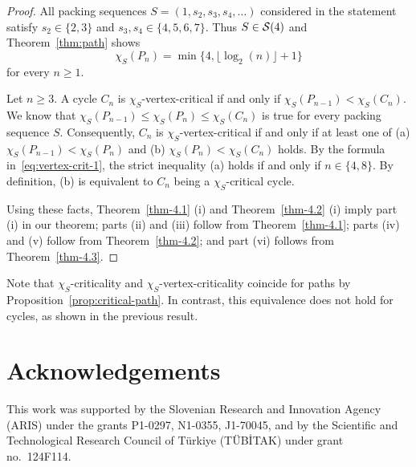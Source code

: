 \documentclass[12pt]{article}
\newcommand{\cS}{{\cal S}}
\begin{document}
    \begin{proof}
        All packing sequences $S=(1, s_2, s_3, s_4, \dots )$ considered in the statement satisfy $s_2 \in \{2,3\}$ and $s_3,s_4 \in \{4,5,6,7\}$.
         Thus  $S \in \cS(4)$ and Theorem~\ref{thm:path} shows
        \begin{equation} \label{eq:vertex-crit-1}
            \chi_S(P_n)= \min \{4,\lfloor \log_2(n) \rfloor +1\}
     \end{equation}
     for every $n \ge 1$. 

        Let $n \ge 3$. A cycle $C_n$ is $\chi_S$-vertex-critical if and only if $\chi_S(P_{n-1}) < \chi_S(C_n)$. We know that $\chi_S(P_{n-1}) \le \chi_S (P_n) \le \chi_S(C_n)$ is true for every packing sequence $S$. Consequently, $C_n$ is $\chi_S$-vertex-critical if and only if at least one of (a) $\chi_S(P_{n-1}) < \chi_S (P_n)$ and (b) $\chi_S (P_n) < \chi_S(C_n)$ holds. By the formula in~\eqref{eq:vertex-crit-1}, the strict inequality (a) holds if and only if $n \in \{4,8\}$. By definition, (b) is equivalent to $C_n$ being a $\chi_S$-critical cycle. 

        Using these facts, Theorem~\ref{thm-4.1} (i) and Theorem~\ref{thm-4.2} (i) imply part (i) in our theorem; parts (ii) and (iii) follow from Theorem~\ref{thm-4.1}; parts (iv) and (v) follow from Theorem~\ref{thm-4.2}; and part (vi) follows from Theorem~\ref{thm-4.3}.  
         \end{proof}

         Note that $\chi_S$-criticality and $\chi_S$-vertex-criticality coincide for paths by Proposition~\ref{prop:critical-path}. In contrast, this equivalence does not hold for cycles, as shown in the previous result.
\section*{Acknowledgements}

This work was supported by the Slovenian Research and Innovation Agency (ARIS) under the grants P1-0297, N1-0355, J1-70045, and by the Scientific and Technological Research Council of Türkiye (TÜBİTAK) under grant no.\ 124F114.

\end{document}
